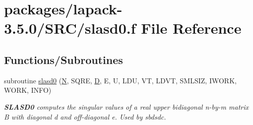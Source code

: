 \hypertarget{slasd0_8f}{}\section{packages/lapack-\/3.5.0/\+S\+R\+C/slasd0.f File Reference}
\label{slasd0_8f}
\subsection*{Functions/\+Subroutines}
\begin{DoxyCompactItemize}
\item 
subroutine \hyperlink{group__auxOTHERauxiliary_ga7a8da896f51f0ce43896b61efa3d0381}{slasd0} (\hyperlink{polmisc_8c_a0240ac851181b84ac374872dc5434ee4}{N}, S\+Q\+R\+E, \hyperlink{odrpack_8h_a7dae6ea403d00f3687f24a874e67d139}{D}, E, U, L\+D\+U, V\+T, L\+D\+V\+T, S\+M\+L\+S\+I\+Z, I\+W\+O\+R\+K, W\+O\+R\+K, I\+N\+F\+O)
\begin{DoxyCompactList}\small\item\em {\bfseries S\+L\+A\+S\+D0} computes the singular values of a real upper bidiagonal n-\/by-\/m matrix B with diagonal d and off-\/diagonal e. Used by sbdsdc. \end{DoxyCompactList}\end{DoxyCompactItemize}
